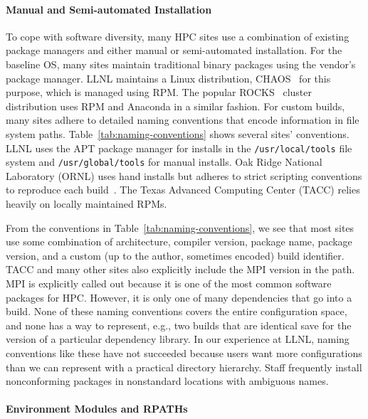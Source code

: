 \paragraph{Manual and Semi-automated Installation}

To cope with software diversity, many HPC sites use a combination of existing
package managers and either manual or semi-automated installation.
For the baseline OS, many sites maintain traditional binary
packages using the vendor's package manager. LLNL maintains a Linux
distribution, CHAOS~\cite{chaos} for this purpose, which is managed using RPM.
The popular ROCKS~\cite{rocks} cluster distribution uses RPM and Anaconda
in a similar fashion.
%
For custom builds, many sites adhere to detailed naming conventions
that encode information in file system paths.
Table~\ref{tab:naming-conventions} shows several sites' conventions.
LLNL uses the APT package manager for installs
in the {\tt /usr/local/tools} file system and {\tt /usr/global/tools}
for manual installs.
Oak Ridge National Laboratory (ORNL) uses hand installs but adheres
to strict scripting conventions
to reproduce each build~\cite{jones+:cug08}.
The Texas Advanced Computing Center (TACC) relies heavily on locally maintained RPMs.

From the conventions in Table~\ref{tab:naming-conventions},
we see that most sites use some combination of architecture, compiler version,
package name, package version, and a custom (up to the author, sometimes
encoded) build identifier.  TACC and many other sites also explicitly
include the MPI version in the path. MPI is explicitly called out
because it is one of the most common software packages for HPC.
However, it is only one of many dependencies that go into a build.
None of these naming conventions covers the entire configuration
space, and none has a way to represent, e.g., two builds that are identical
save for the version of a particular dependency library.  In our experience
at LLNL, naming conventions like these have not succeeded because
users want more configurations than we can represent with a practical
directory hierarchy. Staff frequently install nonconforming packages
in nonstandard locations with ambiguous names.

\paragraph{Environment Modules and RPATHs}\label{sec:env-rpath}


